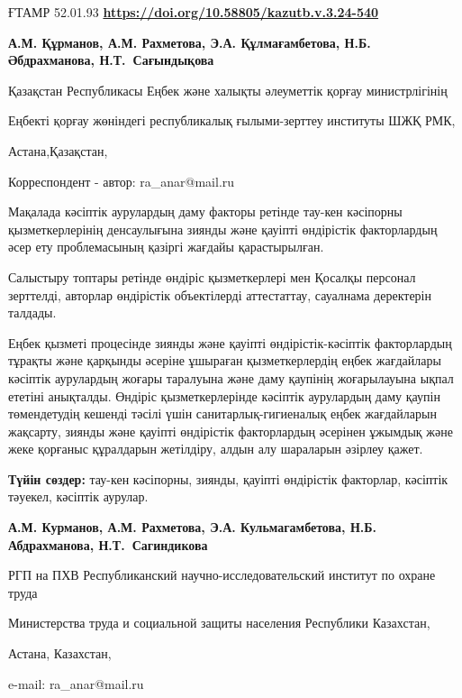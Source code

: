 \newpage
ҒТАМР 52.01.93
\hfill {\bfseries \href{https://doi.org/10.58805/kazutb.v.3.24-540}{https://doi.org/10.58805/kazutb.v.3.24-540}}


\begin{center}
{\bfseries А.М. Құрманов, А.М. Рахметова\envelope, Э.А. Құлмағамбетова, Н.Б. Әбдрахманова, Н.Т.~Сағындықова}

Қазақстан Республикасы Еңбек және халықты әлеуметтік қорғау
министрлігінің

Еңбекті қорғау жөніндегі республикалық ғылыми-зерттеу институты ШЖҚ РМК,

Астана,Қазақстан,
\end{center}
\envelope Корреспондент - автор: ra\_anar@mail.ru


Мақалада кәсіптік аурулардың даму факторы ретінде тау-кен кәсіпорны
қызметкерлерінің денсаулығына зиянды және қауіпті өндірістік
факторлардың әсер ету проблемасының қазіргі жағдайы қарастырылған.

Салыстыру топтары ретінде өндіріс қызметкерлері мен Қосалқы персонал
зерттелді, авторлар өндірістік объектілерді аттестаттау, сауалнама
деректерін талдады.

Еңбек қызметі процесінде зиянды және қауіпті өндірістік-кәсіптік
факторлардың тұрақты және қарқынды әсеріне ұшыраған қызметкерлердің
еңбек жағдайлары кәсіптік аурулардың жоғары таралуына және даму қаупінің
жоғарылауына ықпал ететіні анықталды. Өндіріс қызметкерлерінде кәсіптік
аурулардың даму қаупін төмендетудің кешенді тәсілі үшін
санитарлық-гигиеналық еңбек жағдайларын жақсарту, зиянды және қауіпті
өндірістік факторлардың әсерінен ұжымдық және жеке қорғаныс құралдарын
жетілдіру, алдын алу шараларын әзірлеу қажет.

{\bfseries Түйін сөздер:} тау-кен кәсіпорны, зиянды, қауіпті өндірістік
факторлар, кәсіптік тәуекел, кәсіптік аурулар.


\begin{center}
{\bfseries А.М. Курманов, А.М. Рахметова\envelope, Э.А. Кульмагамбетова, Н.Б. Абдрахманова, Н.Т.~Сагиндикова}

РГП на ПХВ Республиканский научно-исследовательский институт по охране
труда

Министерства труда и социальной защиты населения Республики Казахстан,

Астана, Казахстан,

e-mail: ra\_anar@mail.ru
\end{center}

